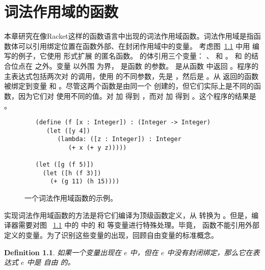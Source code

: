 \documentclass[11pt]{book}
\newtheorem{definition}[theorem]{Definition}
\begin{document}


\chapter{词法作用域的函数}
\label{ch:Rlam}

本章研究在像Racket这样的函数语言中出现的词法作用域函数。词法作用域是指函数体可以引用绑定位置在函数外部、在封闭作用域中的变量。
%
考虑图~\ref{fig:lexical-scoping} 中用
\LangLam{} 编写的例子，它使用  形式扩展 \LangFun{} 的匿名函数。  的体引用三个变量：  、  和  。
 和  的结合位点在  之外。变量
 以外围  为界，  是函数  的参数。  是从函数  中返回 。程序的主表达式包括两次对  的调用，使用  的不同参数，先是
 ，然后是  。从  返回的函数被绑定到变量  和  。尽管这两个函数是由同一个 创建的，但它们实际上是不同的函数，因为它们对  使用不同的值。对  加  得到  ，而对  加  得到  。这个程序的结果是  。

\begin{figure}[btp]
\begin{lstlisting}
   (define (f [x : Integer]) : (Integer -> Integer)
      (let ([y 4])
         (lambda: ([z : Integer]) : Integer
            (+ x (+ y z)))))

   (let ([g (f 5)])
     (let ([h (f 3)])
       (+ (g 11) (h 15))))
\end{lstlisting}
\caption{一个词法作用域函数的示例。}
\label{fig:lexical-scoping}
\end{figure}


实现词法作用域函数的方法是将它们编译为顶级函数定义，从 \LangLam{} 转换为 \LangFun{} 。但是，编译器需要对图 ~\ref{fig:lexical-scoping} 中的  中的 
和  等变量进行特殊处理。毕竟， \LangFun{} 函数不能引用外部定义的变量。为了识别这些变量的出现，回顾自由变量的标准概念。

\begin{definition}
如果一个变量出现在 $e$ 中，但在 $e$ 中没有封闭绑定，那么它在表达式 $e$ 中是 \emph{自由} 的。
\end{definition}
\end{document}
